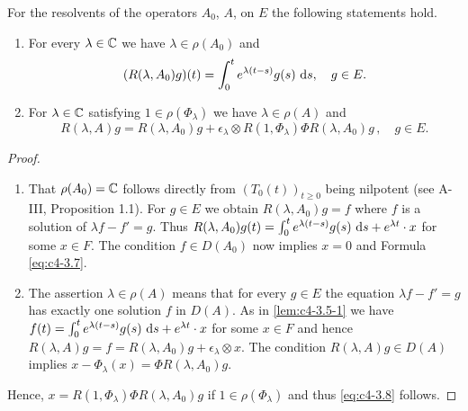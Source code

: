 \begin{lemma}\label{lem:c4-3.5}
%
%
For the resolvents of the operators $A_{0}$, \resp $A$, on $E$ the following statements hold.
\begin{enumerate}[\upshape (i)]
\item \label{lem:c4-3.5-1}
For every $\lambda \in \mathbb{C}$ we have $\lambda \in \rho(A_{0})$ and
\begin{equation}\label{eq:c4-3.7}
(R(\lambda,A_{0})g)(t) = \int_{0}^{t} e^{\lambda(t-s)}g(s)\, \mathop{}\!\mathrm{d}{s}, \quad g \in E.
\end{equation}
\item \label{lem:c4-3.5-2}
For $\lambda \in \mathbb{C}$ satisfying $1 \in \rho(\Phi_{\lambda})$ we have $\lambda \in \rho(A)$ and
\begin{equation}\label{eq:c4-3.8}
R(\lambda,A)g = R(\lambda,A_{0})g + \epsilon_{\lambda} \otimes R(1,\Phi_{\lambda})\Phi R(\lambda,A_{0})g\,, \quad g \in E.
\end{equation}
\end{enumerate}
\end{lemma}
\begin{proof}
\begin{enumerate}[\upshape (i), wide, labelindent=.5em] 
    \item 
    That $\rho(A_{0}) = \mathbb{C}$ follows directly from $(T_{0}(t))_{t \geq 0}$ being nilpotent (see A-III, Proposition 1.1). For $g \in E$ we obtain $R(\lambda,A_{0})g = f$ where $f$ is a solution of $\lambda f - f' = g$.
    Thus $R(\lambda,A_{0})g(t) = \int_{0}^{t} e^{\lambda(t-s)}g(s)\, \mathop{}\!\mathrm{d}{s} + e^{\lambda t} \cdot x$ for some $x \in F$. The condition $f \in D(A_{0})$ now implies $x = 0$ and Formula \eqref{eq:c4-3.7}.
    
    \item 
    The assertion $\lambda \in \rho(A)$ means that for every $g \in E$ the equation $\lambda f - f' = g$ has exactly one solution $f$ in $D(A)$. As in \ref{lem:c4-3.5-1} we have 
    $f(t) = \int_{0}^{t} e^{\lambda(t-s)}g(s)\, \mathop{}\!\mathrm{d}{s} + e^{\lambda t} \cdot x$ for some $x \in F$ and hence
    $R(\lambda,A)g = f = R(\lambda,A_{0})g + \epsilon_{\lambda}  \otimes x$. 
    The condition $R(\lambda,A)g \in D(A)$ implies $x - \Phi_{\lambda}(x) = \Phi R(\lambda,A_{0})g$. 
\end{enumerate}    
    Hence, $x = R(1,\Phi_{\lambda})\Phi R(\lambda,A_{0})g$ if $1 \in \rho(\Phi_{\lambda})$ and thus \eqref{eq:c4-3.8} follows.
\end{proof}
